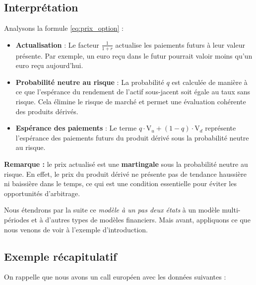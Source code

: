 \documentclass[12pt,a4paper]{article}
\begin{document}

\subsection{Interprétation}

Analysons la formule \eqref{eq:prix_option} :

\begin{itemize}
    \item \textbf{Actualisation} : Le facteur \(\frac{1}{1 + r}\) actualise les paiements futurs à leur valeur présente. Par exemple, un euro reçu dans le futur pourrait valoir moins qu'un euro reçu aujourd'hui.
    \item \textbf{Probabilité neutre au risque} : La probabilité \( q \) est calculée de manière à ce que l'espérance du rendement de l'actif sous-jacent soit égale au taux sans risque. Cela élimine le risque de marché et permet une évaluation cohérente des produits dérivés.
    \item \textbf{Espérance des paiements} : Le terme \( q \cdot \text{V}_u + (1 - q) \cdot \text{V}_d \) représente l'espérance des paiements futurs du produit dérivé sous la probabilité neutre au risque.

\end{itemize}
\textbf{Remarque :} le prix actualisé est une \textbf{martingale} sous la probabilité neutre au risque. En effet, le prix du produit dérivé ne présente pas de tendance haussière ni baissière dans le temps, ce qui est une condition essentielle pour éviter les opportunités d'arbitrage.

\vspace{0.25cm}

Nous étendrons par la suite ce \textit{modèle à un pas deux états} à un modèle multi-périodes et à d'autres types de modèles financiers. Mais avant, appliquons ce que nous venons de voir à l'exemple d'introduction.

\subsection{Exemple récapitulatif}

On rappelle que nous avons un call européen avec les données suivantes :
\end{document}
